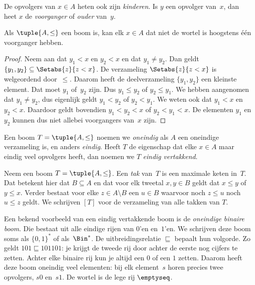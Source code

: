 \documentclass[../../../include/open-logic-section]{subfiles}
\begin{document}
De opvolgers van $x \in A$ heten ook zijn \emph{kinderen}. Is $y$ een
opvolger van~$x$, dan heet $x$ de \emph{voorganger} of \emph{ouder}
van~$y$.

\begin{prop}
Als $\tuple{A,\le}$ een boom is, kan elk $x \in A$ dat niet de wortel
is hoogstens één voorganger hebben.
\end{prop}

\begin{proof}
  Neem aan dat $y_1 < x$ en $y_2 < x$ en dat $y_1 \neq y_2$. Dan
  geldt $\{y_1, y_2\} \subseteq \Setabs{z}{z<x}$. De verzameling
  $\Setabs{z}{z<x}$ is welgeordend door~$\le$. Daarom heeft de
  deelverzameling $\{y_1, y_2\}$ een kleinste element. Dat moet $y_1$
  of~$y_2$ zijn. Dus $y_1 \le y_2$ of $y_2 \le y_1$. We hebben
  aangenomen dat $y_1 \neq y_2$, dus eigenlijk geldt $y_1 < y_2$ of
  $y_2 < y_1$. We weten ook dat $y_1 < x$ en $y_2 < x$. Daardoor
  geldt bovendien $y_1 < y_2 < x$ of $y_2 < y_1 < x$. De elementen
  $y_1$ en $y_2$ kunnen dus niet allebei voorgangers van~$x$ zijn.
\end{proof}

\begin{defn}
Een boom $T = \tuple{A, \le}$ noemen we \emph{oneindig} als $A$ een
oneindige verzameling is, en anders \emph{eindig}. Heeft $T$ de
eigenschap dat elke $x \in A$ maar eindig veel opvolgers heeft, dan
noemen we $T$ \emph{eindig vertakkend}.
\end{defn}

\begin{defn}[Takken]
Neem een boom $T = \tuple{A, \le}$. Een \emph{tak} van~$T$ is een
maximale keten in~$T$. Dat betekent hier dat $B \subseteq A$ en dat
voor elk tweetal $x, y \in B$ geldt dat $x \le y$ of $y \le x$.
Verder bestaat voor elke $z \in A \setminus B$ een $u \in B$ waarvoor
noch $z \le u$ noch $u \le z$ geldt.
%
We schrijven $[T]$ voor de verzameling van alle takken van $T$.
\end{defn}

\begin{ex}
Een bekend voorbeeld van een eindig vertakkende boom is de
\emph{oneindige binaire boom}. Die bestaat uit alle eindige rijen
van $0$'en en~$1$'en. We schrijven deze boom soms als $\{0,1\}^*$ of
als~$\Bin^*$. De uitbreidingsrelatie $\sqsubseteq$ bepaalt hun
volgorde. Zo geldt $101 \sqsubseteq 101101$: je krijgt de tweede rij
door achter de eerste nog cijfers te zetten. Achter elke binaire rij
kun je altijd een
$0$ of een $1$ zetten. Daarom heeft deze boom oneindig veel
elementen: bij elk element~$s$ horen precies twee opvolgers, $s0$
en~$s1$. De wortel is de lege rij $\emptyseq$.
\end{ex}
\end{document}
